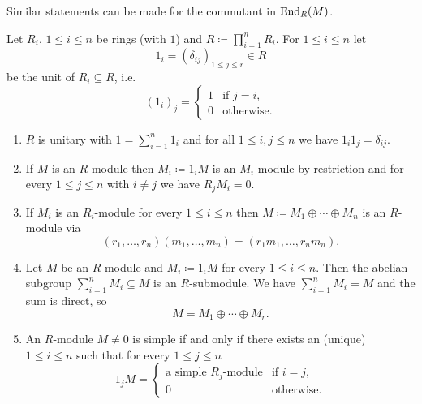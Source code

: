 \begin{rem}
 Similar statements can be made for the commutant in $\operatorname{End}_R(M)$.
\end{rem}


\begin{lem}\label{lem: modules over direct sum of algebras}
 Let $R_i$, $1 \leq i \leq n$ be rings (with $1$) and $R \coloneqq \prod_{i=1}^n R_i$. For $1 \leq i \leq n$ let
 \[
  1_i = (\delta_{ij})_{1 \leq j \leq r} \in R
 \]
 be the unit of $R_i \subseteq R$, i.e.
 \[
  (1_i)_j =
  \begin{cases}
   1 & \text{if } j = i, \\
   0 & \text{otherwise}.
  \end{cases}
 \]
 \begin{enumerate}[label=\emph{\alph*}),leftmargin=*]
  \item
   $R$ is unitary with $1 = \sum_{i=1}^n 1_i$ and for all $1 \leq i,j \leq n$ we have $1_i 1_j = \delta_{ij}$.
  \item
   If $M$ is an $R$-module then $M_i \coloneqq 1_i M$ is an $M_i$-module by restriction and for every $1 \leq j \leq n$ with $i \neq j$ we have $R_j M_i = 0$.
  \item
   If $M_i$ is an $R_i$-module for every $1 \leq i \leq n$ then $M \coloneqq M_1 \oplus \dotsb \oplus M_n$ is an $R$-module via
   \[
    (r_1, \dotsc, r_n) (m_1, \dotsc, m_n) = (r_1 m_1, \dotsc, r_n m_n).
   \]
  \item
   Let $M$ be an $R$-module and $M_i \coloneqq 1_i M$ for every $1 \leq i \leq n$. Then the abelian subgroup \mbox{$\sum_{i=1}^n M_i \subseteq M$} is an $R$-submodule. We have $\sum_{i=1}^n M_i = M$ and the sum is direct, so
   \[
    M = M_1 \oplus \dotsb \oplus M_r.
   \]
  \item
   An $R$-module $M \neq 0$ is simple if and only if there exists an (unique) \mbox{$1 \leq i \leq n$} such that for every $1 \leq j \leq n$
   \[
    1_j M =
    \begin{cases}
     \text{a simple $R_j$-module} & \text{if } i = j, \\
                                0 & \text{otherwise}.
    \end{cases}
   \]
 \end{enumerate}
\end{lem}
